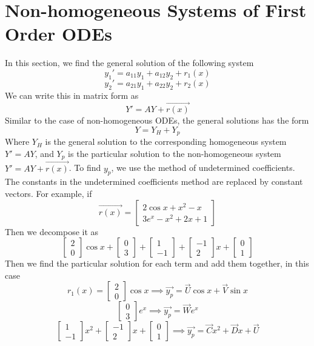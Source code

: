 \documentclass[openany]{report}
\begin{document}
\section{Non-homogeneous Systems of First Order ODEs}
In this section, we find the general solution of the following system
\[y_1' = a_{11}y_1 + a_{12}y_2 + r_1(x)\]
\[y_2' = a_{21}y_1 + a_{22}y_2 + r_2(x)\]
We can write this in matrix form as
\[Y' = AY + \vec{r(x)}\]
Similar to the case of non-homogeneous ODEs, the general solutions has the form 
\[Y = Y_H + Y_p\]
Where $Y_H$ is the general solution to the corresponding homogeneous system $Y' = AY$, and $Y_p$ is the particular solution to the non-homogeneous system $Y' = AY + \vec{r(x)}$. To find $y_p$, we use the method of undetermined coefficients. The constants in the undetermined coefficients method are replaced by constant vectors. For example, if 
\[\vec{r(x)} = \begin{bmatrix}
    2\cos x + x^2 - x \\
    3e^x - x^2 + 2x + 1
\end{bmatrix}\]
Then we decompose it as 
\[\begin{bmatrix}
    2\\
    0
\end{bmatrix}\cos x + \begin{bmatrix}
    0\\
    3
\end{bmatrix} + \begin{bmatrix}
    1\\
    -1
\end{bmatrix} + \begin{bmatrix}
    -1\\
    2
\end{bmatrix}x + \begin{bmatrix}
    0\\
    1
\end{bmatrix}\]
Then we find the particular solution for each term and add them together, in this case 
\[r_1(x) = \begin{bmatrix}
    2\\
    0
\end{bmatrix}\cos x \implies \vec{y_p} = \vec{U}\cos x + \vec{V}\sin x\]
\[\begin{bmatrix}
    0\\
    3
\end{bmatrix}e^x \implies \vec{y_p} = \vec{W}e^x\]
\[\begin{bmatrix}
    1\\
    -1
\end{bmatrix}x^2 + \begin{bmatrix}
    -1\\
    2
\end{bmatrix}x + \begin{bmatrix}
    0\\
    1
\end{bmatrix} \implies \vec{y_p} = \vec{C}x^2 + \vec{D}x + \vec{U}\]
\end{document}
